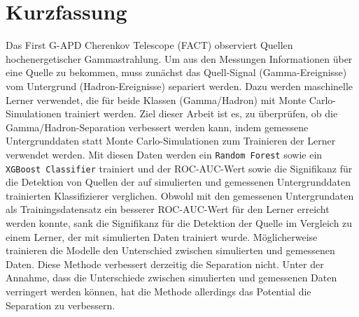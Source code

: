 \thispagestyle{plain}

\section*{Kurzfassung}
Das First G-APD Cherenkov Telescope (FACT) observiert Quellen hochenergetischer Gammastrahlung.
Um aus den Messungen Informationen über eine Quelle zu bekommen, muss zunächst das Quell-Signal (Gamma-Ereignisse) vom Untergrund (Hadron-Ereignisse) separiert werden.
Dazu werden maschinelle Lerner verwendet, die für beide Klassen (Gamma/Hadron) mit Monte Carlo-Simulationen trainiert werden.
Ziel dieser Arbeit ist es, zu überprüfen, ob die Gamma/Hadron-Separation verbessert werden kann, indem gemessene Untergrunddaten statt Monte Carlo-Simulationen zum Trainieren der Lerner verwendet werden.
Mit diesen Daten werden ein \texttt{Random Forest} sowie ein \texttt{XGBoost Classifier} trainiert und der ROC-AUC-Wert sowie die Signifikanz für die Detektion von Quellen der auf simulierten und gemessenen Untergrunddaten trainierten Klassifizierer verglichen. 
Obwohl mit den gemessenen Untergrundaten als Trainingsdatensatz ein besserer ROC-AUC-Wert für den Lerner erreicht werden konnte, sank die Signifikanz für die Detektion der Quelle im Vergleich zu einem Lerner, der mit simulierten Daten trainiert wurde. 
Möglicherweise trainieren die Modelle den Unterschied zwischen simulierten und gemessenen Daten. 
Diese Methode verbessert derzeitig die Separation nicht. 
Unter der Annahme, dass die Unterschiede zwischen simulierten und gemessenen Daten verringert werden können, hat die Methode allerdings das Potential die Separation zu verbessern. 
